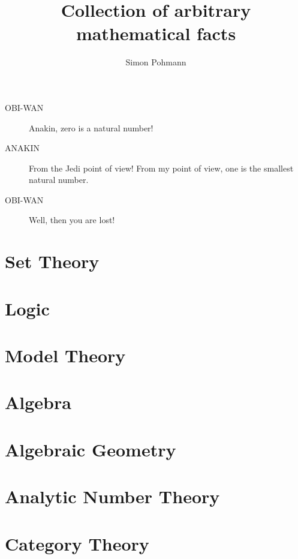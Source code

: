\documentclass{scrartcl}
\title{Collection of arbitrary mathematical facts}
\author{Simon Pohmann}
\date{}
\begin{document}
\maketitle

\tableofcontents

\begin{description}
    \item[OBI-WAN] Anakin, zero is a natural number!
    \item[ANAKIN] From the Jedi point of view! From my point of view, one is the smallest natural number.
    \item[OBI-WAN] Well, then you are lost!
\end{description}

\section{Set Theory}



\section{Logic}



\section{Model Theory}



\section{Algebra}



\section{Algebraic Geometry}



\section{Analytic Number Theory}



\section{Category Theory}
\end{document}
